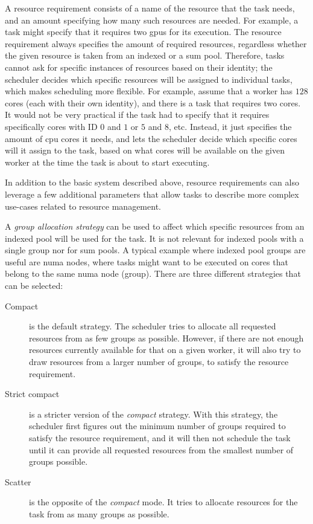 A resource requirement consists of a name of the resource that the task needs, and an amount
specifying how many such resources are needed. For example, a task might specify that it requires
two \glspl{gpu} for its execution. The resource requirement always specifies the amount
of required resources, regardless whether the given resource is taken from an indexed or a sum
pool. Therefore, tasks cannot ask for specific instances of resources based on their identity; the
scheduler decides which specific resources will be assigned to individual tasks, which makes
scheduling more flexible. For example, assume that a worker has $128$ cores (each
with their own identity), and there is a task that requires two cores. It would not be very
practical if the task had to specify that it requires specifically cores with ID
$0$ and $1$ or $5$ and
$8$, etc. Instead, it just specifies the amount of \gls{cpu} cores
it needs, and lets the scheduler decide which specific cores will it assign to the task, based on
what cores will be available on the given worker at the time the task is about to start executing.

In addition to the basic system described above, resource requirements can also leverage a few
additional parameters that allow tasks to describe more complex use-cases related to resource
management.

A \emph{group allocation strategy} can be used to affect which specific resources from an indexed pool will
be used for the task. It is not relevant for indexed pools with a single group nor for sum pools. A
typical example where indexed pool groups are useful are \gls{numa} nodes, where tasks
might want to be executed on cores that belong to the same \gls{numa} node (group). There are three
different strategies that can be selected:
\begin{description}
	\item [Compact] is the default strategy. The scheduler tries to allocate all requested
	      resources from as few groups as possible. However, if there are not enough resources currently
	      available for that on a given worker, it will also try to draw resources from a larger number of
	      groups, to satisfy the resource requirement.
	\item [Strict compact] is a stricter version of the \emph{compact} strategy. With this
	      strategy, the scheduler first figures out the minimum number of groups required to satisfy the
	      resource requirement, and it will then not schedule the task until it can provide all requested
	      resources from the smallest number of groups possible.
	\item [Scatter] is the opposite of the \emph{compact} mode. It tries to allocate resources
	      for the task from as many groups as possible.
\end{description}

